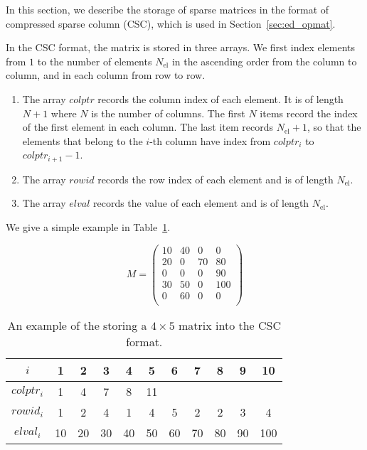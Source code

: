 \documentclass{timesjhep}
\begin{document}
In this section, we describe the storage of sparse matrices in the format of compressed sparse column (CSC), which is used in Section~\ref{sec:ed_opmat}. 

In the CSC format, the matrix is stored in three arrays. We first index elements from $1$ to the number of elements $N_\mathrm{el}$ in the ascending order from the column to column, and in each column from row to row. 
\begin{enumerate}
    \item The array $colptr$ records the column index of each element. It is of length $N+1$ where $N$ is the number of columns. The first $N$ items record the index of the first element in each column. The last item records $N_\mathrm{el}+1$, so that the elements that belong to the $i$-th column have index from $colptr_i$ to $colptr_{i+1}-1$.
    \item The array $rowid$ records the row index of each element and is of length $N_\mathrm{el}$.
    \item The array $elval$ records the value of each element and is of length $N_\mathrm{el}$.
\end{enumerate}
We give a simple example in Table~\ref{tbl:csc_eg}.

\begin{table}[htbp]
    \centering
    \begin{equation*}
        M=\begin{pmatrix}
            10&40&0&0\\
            20&0&70&80\\
            0&0&0&90\\
            30&50&0&100\\
            0&60&0&0\\
        \end{pmatrix}
    \end{equation*}
    \begin{tabular}{c|cccccccccc}
        \hline\hline
        $i$&1&2&3&4&5&6&7&8&9&10\\
        \hline
        $colptr_i$&1&4&7&8&11\\
        $rowid_i$&1&2&4&1&4&5&2&2&3&4\\
        $elval_i$&10&20&30&40&50&60&70&80&90&100\\
        \hline\hline
    \end{tabular}
    \caption{An example of the storing a $4\times 5$ matrix into the CSC format. }
    \label{tbl:csc_eg}
\end{table}
\end{document}
